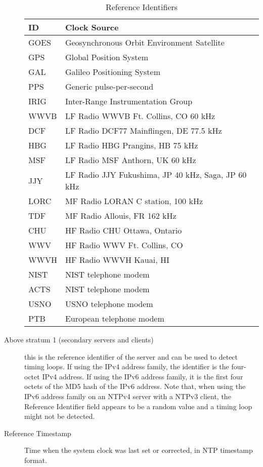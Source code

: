 \begin{description}
\begin{table}[htb]
\center
\begin{tabular}{| l | l |}
\hline
ID & Clock Source \\
\hline
\hline
GOES & Geosynchronous Orbit Environment Satellite \\
GPS & Global Position System \\
GAL & Galileo Positioning System \\
PPS & Generic pulse-per-second \\
IRIG & Inter-Range Instrumentation Group \\
WWVB & LF Radio WWVB Ft. Collins, CO 60 kHz \\
DCF & LF Radio DCF77 Mainflingen, DE 77.5 kHz \\
HBG & LF Radio HBG Prangins, HB 75 kHz \\
MSF & LF Radio MSF Anthorn, UK 60 kHz \\
JJY & LF Radio JJY Fukushima, JP 40 kHz, Saga, JP 60 kHz \\
LORC & MF Radio LORAN C station, 100 kHz \\
TDF & MF Radio Allouis, FR 162 kHz \\
CHU & HF Radio CHU Ottawa, Ontario \\
WWV & HF Radio WWV Ft. Collins, CO \\
WWVH & HF Radio WWVH Kauai, HI \\
NIST & NIST telephone modem \\
ACTS & NIST telephone modem \\
USNO & USNO telephone modem \\
PTB & European telephone modem \\
\hline
\end{tabular}
\caption{Reference Identifiers}
\label{reference_identifiers}
\end{table}

\item[Above stratum 1 (secondary servers and clients)] this is the
reference identifier of the server and can be used to detect timing
loops. If using the IPv4 address family, the identifier is the four-
octet IPv4 address. If using the IPv6 address family, it is the
first four octets of the MD5 hash of the IPv6 address. Note that,
when using the IPv6 address family on an NTPv4 server with a NTPv3
client, the Reference Identifier field appears to be a random value
and a timing loop might not be detected.

\item[Reference Timestamp] Time when the system clock was last set or
corrected, in NTP timestamp format.


\end{description}
